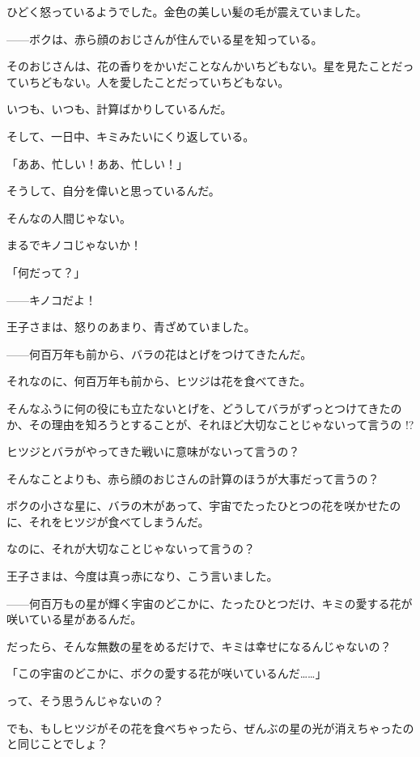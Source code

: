 ひどく怒っているようでした。金色の美しい髪の毛が震えていました。

——ボクは、赤ら顔のおじさんが住んでいる星を知っている。

そのおじさんは、花の香りをかいだことなんかいちどもない。星を見たことだっていちどもない。人を愛したことだっていちどもない。

いつも、いつも、計算ばかりしているんだ。

そして、一日中、キミみたいにくり返している。


「ああ、忙しい！ああ、忙しい！」

そうして、自分を偉いと思っているんだ。

そんなの人間じゃない。

まるでキノコじゃないか！

「何だって？」

——キノコだよ！

王子さまは、怒りのあまり、青ざめていました。

——何百万年も前から、バラの花はとげをつけてきたんだ。

それなのに、何百万年も前から、ヒツジは花を食べてきた。

そんなふうに何の役にも立たないとげを、どうしてバラがずっとつけてきたのか、その理由を知ろうとすることが、それほど大切なことじゃないって言うの !?

ヒツジとバラがやってきた戦いに意味がないって言うの？

そんなことよりも、赤ら顔のおじさんの計算のほうが大事だって言うの？

ボクの小さな星に、バラの木があって、宇宙でたったひとつの花を咲かせたのに、それをヒツジが食べてしまうんだ。

なのに、それが大切なことじゃないって言うの？

王子さまは、今度は真っ赤になり、こう言いました。

——何百万もの星が輝く宇宙のどこかに、たったひとつだけ、キミの愛する花が咲いている星があるんだ。

だったら、そんな無数の星をめるだけで、キミは幸せになるんじゃないの？


「この宇宙のどこかに、ボクの愛する花が咲いているんだ……」

って、そう思うんじゃないの？

でも、もしヒツジがその花を食べちゃったら、ぜんぶの星の光が消えちゃったのと同じことでしょ？


